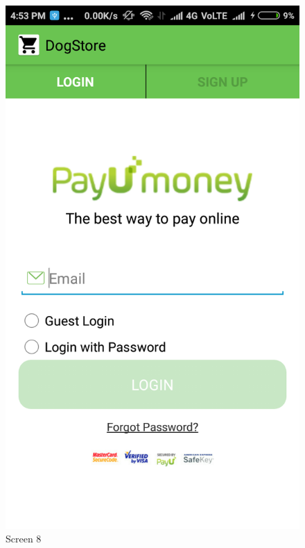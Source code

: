 \begin{figure}[ht]
\centering
\includegraphics[scale=0.30]{images/10.png}
\caption{Screen 8}
\end{figure}

\newpage

